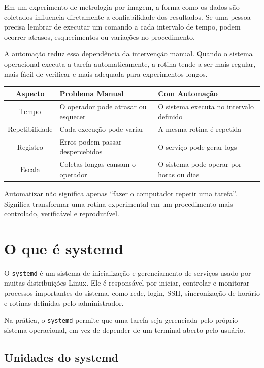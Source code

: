 \documentclass[12pt]{article}
\begin{document}
Em um experimento de metrologia por imagem, a forma como os dados são coletados influencia diretamente a confiabilidade dos resultados. Se uma pessoa precisa lembrar de executar um comando a cada intervalo de tempo, podem ocorrer atrasos, esquecimentos ou variações no procedimento.

A automação reduz essa dependência da intervenção manual. Quando o sistema operacional executa a tarefa automaticamente, a rotina tende a ser mais regular, mais fácil de verificar e mais adequada para experimentos longos.

\begin{cmdbox}
\begin{tabularx}{\linewidth}{@{}C >{\raggedright\arraybackslash}X >{\raggedright\arraybackslash}X@{}}
\toprule
\textbf{Aspecto} & \textbf{Problema Manual} & \textbf{Com Automação} \\
\midrule
Tempo & O operador pode atrasar ou esquecer & O sistema executa no intervalo definido \\
Repetibilidade & Cada execução pode variar & A mesma rotina é repetida \\
Registro & Erros podem passar despercebidos & O serviço pode gerar logs \\
Escala & Coletas longas cansam o operador & O sistema pode operar por horas ou dias \\
\bottomrule
\end{tabularx}
\end{cmdbox}

Automatizar não significa apenas ``fazer o computador repetir uma tarefa''. Significa transformar uma rotina experimental em um procedimento mais controlado, verificável e reprodutível.

\section{O que é systemd}

O \texttt{systemd} é um sistema de inicialização e gerenciamento de serviços usado por muitas distribuições Linux. Ele é responsável por iniciar, controlar e monitorar processos importantes do sistema, como rede, login, SSH, sincronização de horário e rotinas definidas pelo administrador.

Na prática, o \texttt{systemd} permite que uma tarefa seja gerenciada pelo próprio sistema operacional, em vez de depender de um terminal aberto pelo usuário.

\subsection{Unidades do systemd}
\end{document}
